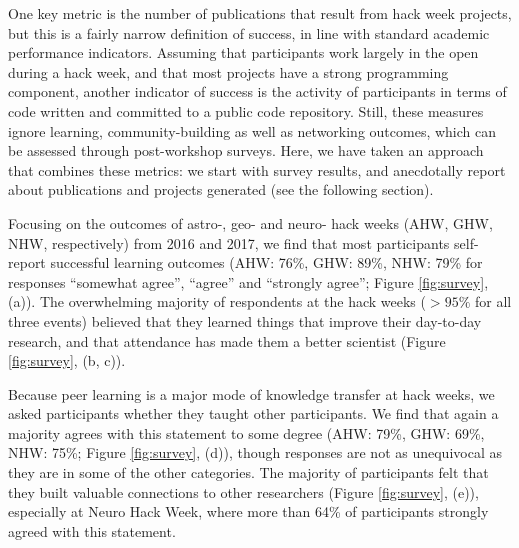 One key metric is the number of publications that result from hack week projects, but this is a fairly narrow definition of success, in line with standard academic performance indicators.
Assuming that participants work largely in the open during a hack week, and that most projects have a strong programming component, another indicator of success is the activity of participants in terms of code written and committed to a public code repository.
Still, these measures ignore learning, community-building as well as networking outcomes, which can be assessed through post-workshop surveys.
Here, we have taken an approach that combines these metrics: we start with survey results, and anecdotally report about publications and projects generated (see the following section).

Focusing on the outcomes of astro-, geo- and neuro- hack weeks (AHW, GHW, NHW, respectively) from 2016 and 2017, we find that most participants self-report successful learning outcomes (AHW: 76\%, GHW: 89\%, NHW: 79\% for responses ``somewhat agree'', ``agree'' and ``strongly agree''; Figure \ref{fig:survey}, (a)).
The overwhelming majority of respondents at the hack weeks ($>95\%$ for all three events) believed that they learned things that improve their day-to-day research, and that attendance has made them a better scientist (Figure \ref{fig:survey}, (b, c)).

Because peer learning is a major mode of knowledge transfer at hack weeks, we asked participants whether they taught other participants.
We find that again a majority agrees with this statement to some degree (AHW: 79\%, GHW: 69\%, NHW: 75\%; Figure \ref{fig:survey}, (d)), though responses are not as unequivocal as they are in some of the other categories.
The majority of participants felt that they built valuable connections to other researchers (Figure \ref{fig:survey}, (e)), especially at Neuro Hack Week, where more than 64\% of participants strongly agreed with this statement. 

